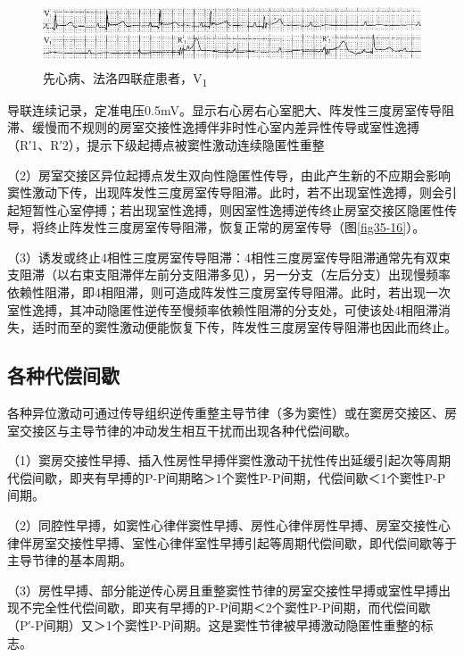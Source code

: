 \begin{figure}[!htbp]
 \centering
 \includegraphics[width=5.58333in,height=0.75in]{./images/Image00556.jpg}
 \captionsetup{justification=centering}
 \caption{先心病、法洛四联症患者，V\textsubscript{1}}
 \label{fig35-3}
  \end{figure} 
导联连续记录，定准电压0.5mV。显示右心房右心室肥大、阵发性三度房室传导阻滞、缓慢而不规则的房室交接性逸搏伴非时性心室内差异性传导或室性逸搏（R′1、R′2），提示下级起搏点被窦性激动连续隐匿性重整

（2）房室交接区异位起搏点发生双向性隐匿性传导，由此产生新的不应期会影响窦性激动下传，出现阵发性三度房室传导阻滞。此时，若不出现室性逸搏，则会引起短暂性心室停搏；若出现室性逸搏，则因室性逸搏逆传终止房室交接区隐匿性传导，将终止阵发性三度房室传导阻滞，恢复正常的房室传导（图\ref{fig35-16}）。

（3）诱发或终止4相性三度房室传导阻滞：4相性三度房室传导阻滞通常先有双束支阻滞（以右束支阻滞伴左前分支阻滞多见），另一分支（左后分支）出现慢频率依赖性阻滞，即4相阻滞，则可造成阵发性三度房室传导阻滞。此时，若出现一次室性逸搏，其冲动隐匿性逆传至慢频率依赖性阻滞的分支处，可使该处4相阻滞消失，适时而至的窦性激动便能恢复下传，阵发性三度房室传导阻滞也因此而终止。

\protect\hypertarget{text00042.htmlux5cux23subid456}{}{}

\subsection{各种代偿间歇}

各种异位激动可通过传导组织逆传重整主导节律（多为窦性）或在窦房交接区、房室交接区与主导节律的冲动发生相互干扰而出现各种代偿间歇。

（1）窦房交接性早搏、插入性房性早搏伴窦性激动干扰性传出延缓引起次等周期代偿间歇，即夹有早搏的P-P间期略＞1个窦性P-P间期，代偿间歇＜1个窦性P-P间期。

（2）同腔性早搏，如窦性心律伴窦性早搏、房性心律伴房性早搏、房室交接性心律伴房室交接性早搏、室性心律伴室性早搏引起等周期代偿间歇，即代偿间歇等于主导节律的基本周期。

（3）房性早搏、部分能逆传心房且重整窦性节律的房室交接性早搏或室性早搏出现不完全性代偿间歇，即夹有早搏的P-P间期＜2个窦性P-P间期，而代偿间歇（P′-P间期）又＞1个窦性P-P间期。这是窦性节律被早搏激动隐匿性重整的标志。

